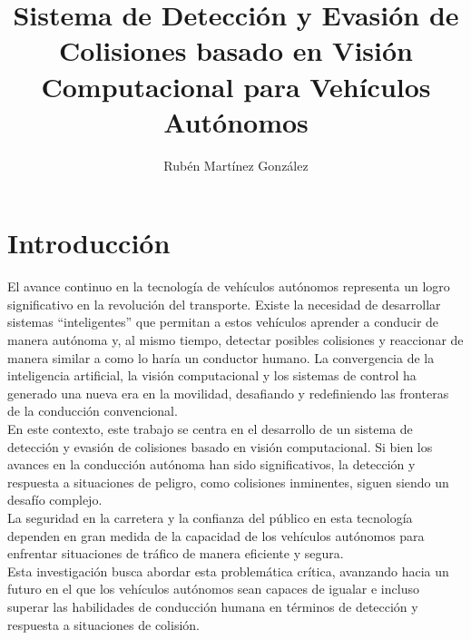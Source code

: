 \documentclass[10pt,letterpaper,final]{article}
\begin{document}
    \section*{}
    \title{Sistema de Detección y Evasión de Colisiones basado en Visión Computacional para Vehículos Autónomos}
    \author{Rubén Martínez González}
    \maketitle
    \clearpage
    \section*{Introducción}
    \noindent
    El avance continuo en la tecnología de vehículos autónomos representa un logro significativo en la revolución del transporte.
    Existe la necesidad de desarrollar sistemas ``inteligentes'' que permitan a estos vehículos aprender a conducir de manera autónoma y,
    al mismo tiempo, detectar posibles colisiones y reaccionar de manera similar a como lo haría un conductor humano.
    La convergencia de la inteligencia artificial, la visión computacional y los sistemas de control ha generado una nueva era en la movilidad,
    desafiando y redefiniendo las fronteras de la conducción convencional.\\ \newline
    En este contexto, este trabajo se centra en el desarrollo de un sistema de detección y evasión de colisiones basado en visión computacional.
    Si bien los avances en la conducción autónoma han sido significativos, la detección y respuesta a
    situaciones de peligro, como colisiones inminentes, siguen siendo un desafío complejo.\\ \newline
    La seguridad en la carretera y la confianza del público en esta tecnología dependen en gran medida de la capacidad
    de los vehículos autónomos para enfrentar situaciones de tráfico de manera eficiente y segura.\\ \newline
    Esta investigación busca abordar esta problemática crítica, avanzando hacia un futuro en el que los vehículos autónomos
    sean capaces de igualar e incluso superar las habilidades de conducción humana en términos de detección y respuesta
    a situaciones de colisión.
    \clearpage
    
\end{document}
